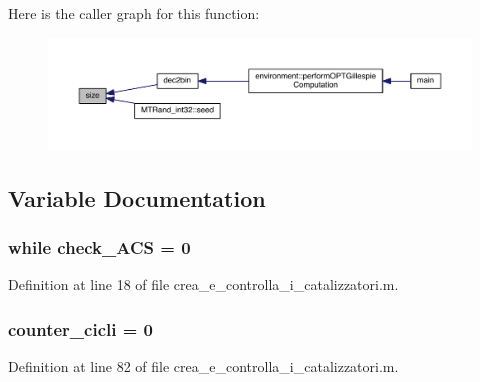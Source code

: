 Here is the caller graph for this function\-:
\nopagebreak
\begin{figure}[H]
\begin{center}
\leavevmode
\includegraphics[width=350pt]{a00062_ae113ea7f9e515a12ac4b5595c6faf61e_icgraph}
\end{center}
\end{figure}




\subsection{Variable Documentation}
\hypertarget{a00062_a516aa1002f0c1375a671e40ee7b79e07}{
\subsubsection[{check\-\_\-\-A\-C\-S}]{\setlength{\rightskip}{0pt plus 5cm}while check\-\_\-\-A\-C\-S = 0}}\label{a00062_a516aa1002f0c1375a671e40ee7b79e07}


Definition at line 18 of file crea\-\_\-e\-\_\-controlla\-\_\-i\-\_\-catalizzatori.\-m.

\hypertarget{a00062_a8b5c7ae18fb63e6cb42a3eac42f1f29e}{
\subsubsection[{counter\-\_\-cicli}]{\setlength{\rightskip}{0pt plus 5cm}counter\-\_\-cicli = 0}}\label{a00062_a8b5c7ae18fb63e6cb42a3eac42f1f29e}


Definition at line 82 of file crea\-\_\-e\-\_\-controlla\-\_\-i\-\_\-catalizzatori.\-m.


